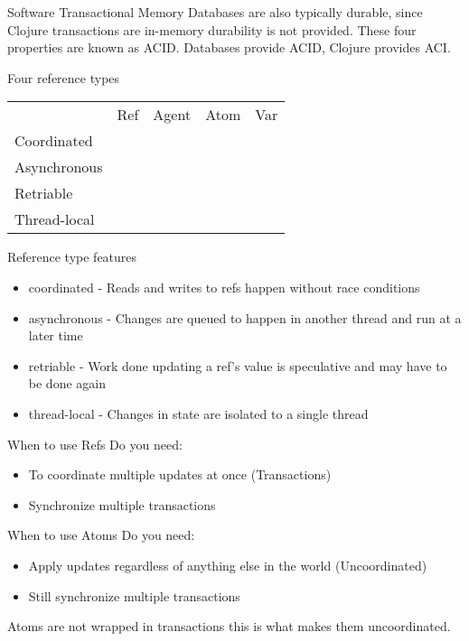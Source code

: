 \documentclass[xcolor=dvipsnames]{beamer}
\begin{document}
			\begin{frame}{Software Transactional Memory}
			Databases are also typically durable, since Clojure transactions are in-memory durability is not provided.		
			These four properties are known as ACID. Databases provide ACID, Clojure provides ACI. 		
		\end{frame}		
		
	\begin{frame}{Four reference types}
	\begin{table}[b]
	\begin{tabular}{ | l | c | c | c | c | }
	\hline
	& Ref & Agent & Atom & Var\\
	Coordinated & \checkmark & & &\\
	Asynchronous & & \checkmark & &\\
	Retriable & \checkmark & & \checkmark &\\
	Thread-local & & & & \checkmark\\
	\hline
	\end{tabular}
	\end{table}
	\end{frame}
	
	\begin{frame}{Reference type features}
		\begin{itemize}
		\item coordinated - Reads and writes to refs happen without race conditions
		\item asynchronous - Changes are queued to happen in another thread and run at a later time
		\item retriable - Work done updating a ref's value is speculative and may have to be done again
		\item thread-local - Changes in state are isolated to a single thread
		\end{itemize}
	\end{frame}
	
	\begin{frame}{When to use Refs}
		Do you need:
		\begin{itemize}
		\item To coordinate multiple updates at once (Transactions)
		\item Synchronize multiple transactions
		\end{itemize}
	\end{frame}
	
	\begin{frame}{When to use Atoms}
		Do you need:
		\begin{itemize}
		\item Apply updates regardless of anything else in the world (Uncoordinated)
		\item Still synchronize multiple transactions
		\end{itemize}
		\pause
		Atoms are not wrapped in transactions this is what makes them uncoordinated.
	\end{frame}
	
\end{document}
